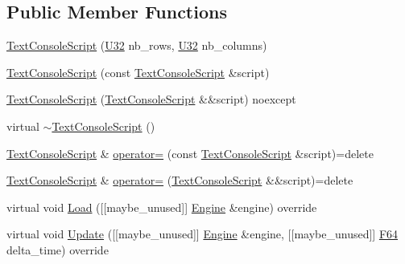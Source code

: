 \subsection*{Public Member Functions}
\begin{DoxyCompactItemize}
\item 
\hyperlink{classmage_1_1script_1_1_text_console_script_a5b26c235c08fb2e443ce3f728985a41e}{Text\+Console\+Script} (\hyperlink{namespacemage_a41c104c036fba3756a74e19f793eeaa1}{U32} nb\+\_\+rows, \hyperlink{namespacemage_a41c104c036fba3756a74e19f793eeaa1}{U32} nb\+\_\+columns)
\item 
\hyperlink{classmage_1_1script_1_1_text_console_script_a82c8a2c15aa51befbfe6341e463057db}{Text\+Console\+Script} (const \hyperlink{classmage_1_1script_1_1_text_console_script}{Text\+Console\+Script} \&script)
\item 
\hyperlink{classmage_1_1script_1_1_text_console_script_a46052af67069fef12a8ff9de75cce382}{Text\+Console\+Script} (\hyperlink{classmage_1_1script_1_1_text_console_script}{Text\+Console\+Script} \&\&script) noexcept
\item 
virtual \hyperlink{classmage_1_1script_1_1_text_console_script_af0959c8a4f21bb4f9b5553dffc5710b9}{$\sim$\+Text\+Console\+Script} ()
\item 
\hyperlink{classmage_1_1script_1_1_text_console_script}{Text\+Console\+Script} \& \hyperlink{classmage_1_1script_1_1_text_console_script_a68af2a144f641c9813b333544fe3562a}{operator=} (const \hyperlink{classmage_1_1script_1_1_text_console_script}{Text\+Console\+Script} \&script)=delete
\item 
\hyperlink{classmage_1_1script_1_1_text_console_script}{Text\+Console\+Script} \& \hyperlink{classmage_1_1script_1_1_text_console_script_ae8560dece8d507ee338dda68e3176fed}{operator=} (\hyperlink{classmage_1_1script_1_1_text_console_script}{Text\+Console\+Script} \&\&script)=delete
\item 
virtual void \hyperlink{classmage_1_1script_1_1_text_console_script_a1e5a7bdff2d47b835932d7220a4e2571}{Load} (\mbox{[}\mbox{[}maybe\+\_\+unused\mbox{]}\mbox{]} \hyperlink{classmage_1_1_engine}{Engine} \&engine) override
\item 
virtual void \hyperlink{classmage_1_1script_1_1_text_console_script_a01603dc7fc00de34dcbe8df01eab8b6a}{Update} (\mbox{[}\mbox{[}maybe\+\_\+unused\mbox{]}\mbox{]} \hyperlink{classmage_1_1_engine}{Engine} \&engine, \mbox{[}\mbox{[}maybe\+\_\+unused\mbox{]}\mbox{]} \hyperlink{namespacemage_ad26233bbec640deda836e572c1a23708}{F64} delta\+\_\+time) override

\end{DoxyCompactItemize}
